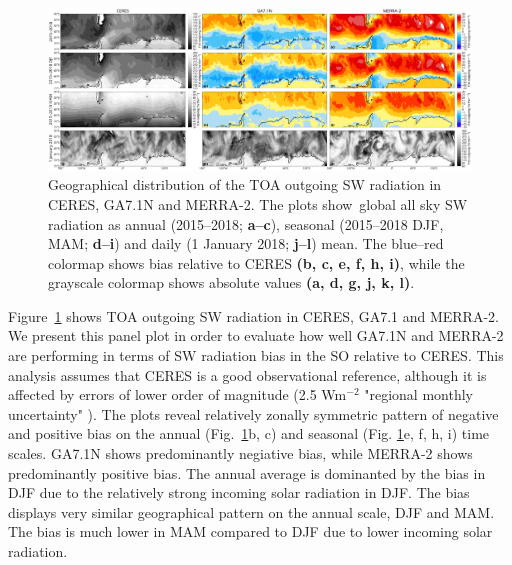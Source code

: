 \begin{figure}[t]
\centering
\centerline{\includegraphics[width=1.12\textwidth]{chapter2/fig/sw_up_toa_geo_rev1.png}}
\caption[Geographical distribution of the TOA outgoing SW radiation in CERES, GA7.1N and
MERRA-2]{
Geographical distribution of the TOA outgoing SW radiation in CERES, GA7.1N and
MERRA-2. The plots show\ global all sky SW radiation as annual (2015--2018;
\textbf{a--c}), seasonal (2015--2018 DJF, MAM; \textbf{d--i}) and daily (1 January 2018; \textbf{j--l})
mean. The blue--red colormap shows bias relative to CERES \textbf{(b, c, e, f, h, i)},
while the grayscale colormap shows absolute values \textbf{(a, d, g, j, k, l)}.
}
\label{fig:2:sw_up_toa_geo}
\end{figure}

Figure~\ref{fig:2:sw_up_toa_geo} shows TOA outgoing SW radiation in CERES, GA7.1
and MERRA-2. We present this panel plot in order to evaluate how well GA7.1N and
MERRA-2 are performing in terms of SW radiation bias in the SO relative to
CERES. This analysis assumes that CERES is a good observational reference,
although it is affected by errors of lower order of magnitude (2.5 Wm$^{-2}$
"regional monthly uncertainty" \citep[Sect. 4a]{loeb2018}). The plots reveal
relatively zonally symmetric pattern of negative and positive bias on the
annual (Fig.~\ref{fig:2:sw_up_toa_geo}b, c) and seasonal (Fig.
\ref{fig:2:sw_up_toa_geo}e, f, h, i) time scales. GA7.1N shows predominantly
negiative bias, while MERRA-2 shows predominantly positive bias. The annual
average is dominanted by the bias in DJF due to the relatively strong incoming
solar radiation in DJF. The bias displays very similar geographical pattern on
the annual scale, DJF and MAM. The bias is much lower in MAM compared to DJF
due to lower incoming solar radiation.

